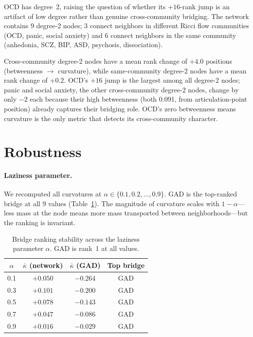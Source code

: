 \documentclass{article}
\begin{document}
OCD has degree~2, raising the question of whether its $+16$-rank jump is an artifact of low degree rather than genuine cross-community bridging. The network contains 9 degree-2 nodes; 3 connect neighbors in different Ricci flow communities (OCD, panic, social anxiety) and 6 connect neighbors in the same community (anhedonia, SCZ, BIP, ASD, psychosis, dissociation).

Cross-community degree-2 nodes have a mean rank change of $+4.0$ positions (betweenness $\to$ curvature), while same-community degree-2 nodes have a mean rank change of $+0.2$. OCD's $+16$ jump is the largest among all degree-2 nodes; panic and social anxiety, the other cross-community degree-2 nodes, change by only $-2$ each because their high betweenness (both 0.091, from articulation-point position) already captures their bridging role. OCD's zero betweenness means curvature is the only metric that detects its cross-community character.

\section{Robustness}
\label{sec:robustness}

\paragraph{Laziness parameter.} We recomputed all curvatures at $\alpha \in \{0.1, 0.2, \ldots, 0.9\}$. GAD is the top-ranked bridge at all 9 values (Table~\ref{tab:alpha}). The magnitude of curvature scales with $1 - \alpha$---less mass at the node means more mass transported between neighborhoods---but the ranking is invariant.

\begin{table}[t]
\centering
\caption{Bridge ranking stability across the laziness parameter $\alpha$. GAD is rank~1 at all values.}
\label{tab:alpha}
\begin{tabular}{cccc}
\toprule
$\alpha$ & $\bar\kappa$ (network) & $\bar\kappa$ (GAD) & Top bridge \\
\midrule
0.1 & $+0.050$ & $-0.264$ & GAD \\
0.3 & $+0.101$ & $-0.200$ & GAD \\
0.5 & $+0.078$ & $-0.143$ & GAD \\
0.7 & $+0.047$ & $-0.086$ & GAD \\
0.9 & $+0.016$ & $-0.029$ & GAD \\
\bottomrule
\end{tabular}
\end{table}
\end{document}
